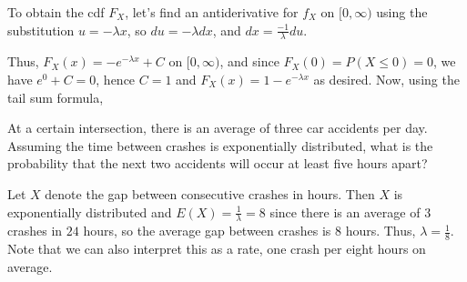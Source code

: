 \begin{pf} To obtain the cdf $F_X$, let's find an antiderivative for $f_X$ on $[0, \infty)$ using the substitution $u  = - \lambda x$, so $du = - \lambda dx$, and $dx = \frac{-1}{\lambda} du$.

\par
\noindent Thus, $F_X(x) = -e^{-\lambda x} + C$ on $[0,\infty)$, and since $F_X(0) = P(X \leq 0) = 0$, we have $e^{0} + C = 0$, hence $C = 1$ and $F_X(x) = 1 - e^{-\lambda x}$ as desired. Now, using the tail sum formula,
\end{pf}
\begin{examp}At a certain intersection, there is an average of three car accidents per day. Assuming the time between crashes is exponentially distributed, what is the probability that the next two accidents will occur at least five hours apart?
\par
\noindent Let $X$ denote the gap between consecutive crashes in hours. Then $X$ is exponentially distributed and $E(X) = \frac{1}{\lambda} = 8$ since there is an average of $3$ crashes in $24$ hours, so the average gap between crashes is $8$ hours. Thus, $\lambda = \frac{1}{8}$. Note that we can also interpret this as a rate, one crash per eight hours on average. 
\end{examp}

